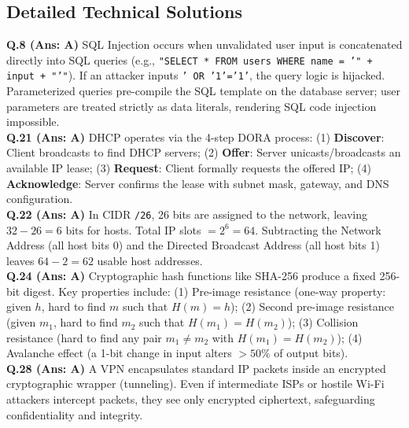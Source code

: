 \vspace{3mm}
\subsection*{Detailed Technical Solutions}

\begin{solutionbox}
\textbf{Q.8 (Ans: A)} SQL Injection occurs when unvalidated user input is concatenated directly into SQL queries (e.g., \texttt{"SELECT * FROM users WHERE name = '" + input + "'"}). If an attacker inputs \texttt{' OR '1'='1'}, the query logic is hijacked. Parameterized queries pre-compile the SQL template on the database server; user parameters are treated strictly as data literals, rendering SQL code injection impossible.\\[2mm]
\textbf{Q.21 (Ans: A)} DHCP operates via the 4-step DORA process: (1) \textbf{Discover}: Client broadcasts to find DHCP servers; (2) \textbf{Offer}: Server unicasts/broadcasts an available IP lease; (3) \textbf{Request}: Client formally requests the offered IP; (4) \textbf{Acknowledge}: Server confirms the lease with subnet mask, gateway, and DNS configuration.\\[2mm]
\textbf{Q.22 (Ans: A)} In CIDR \texttt{/26}, 26 bits are assigned to the network, leaving $32 - 26 = 6\text{ bits}$ for hosts. Total IP slots $= 2^6 = 64$. Subtracting the Network Address (all host bits 0) and the Directed Broadcast Address (all host bits 1) leaves $64 - 2 = 62$ usable host addresses.\\[2mm]
\textbf{Q.24 (Ans: A)} Cryptographic hash functions like SHA-256 produce a fixed 256-bit digest. Key properties include: (1) Pre-image resistance (one-way property: given $h$, hard to find $m$ such that $H(m) = h$); (2) Second pre-image resistance (given $m_1$, hard to find $m_2$ such that $H(m_1) = H(m_2)$); (3) Collision resistance (hard to find any pair $m_1 \ne m_2$ with $H(m_1) = H(m_2)$); (4) Avalanche effect (a 1-bit change in input alters $>50\%$ of output bits).\\[2mm]
\textbf{Q.28 (Ans: A)} A VPN encapsulates standard IP packets inside an encrypted cryptographic wrapper (tunneling). Even if intermediate ISPs or hostile Wi-Fi attackers intercept packets, they see only encrypted ciphertext, safeguarding confidentiality and integrity.
\end{solutionbox}

\newpage
